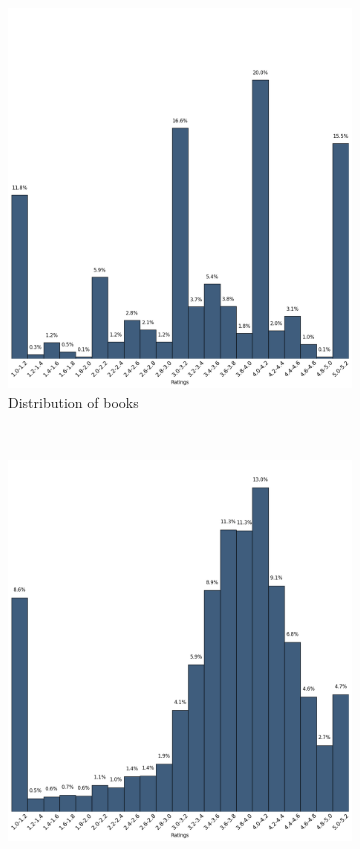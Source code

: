 \documentclass[11pt]{article}
\begin{document}
\begin{figure}
        \centering
        \begin{subfigure}[b]{0.5\textwidth}
                \includegraphics[width=\textwidth]{images/books_ratings}
                \caption{Distribution of books}
        \end{subfigure}%
        ~ %
        \begin{subfigure}[b]{0.5\textwidth}
                \includegraphics[width=\textwidth]{images/user_ratings}

\end{subfigure}
\end{figure}
\end{document}
